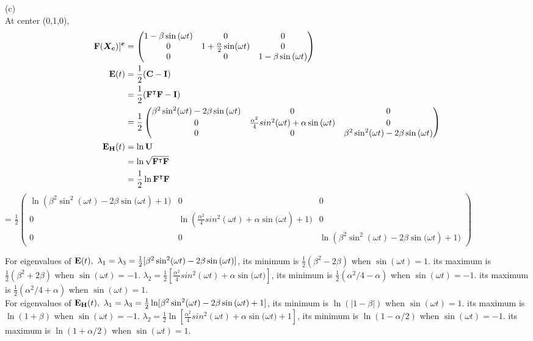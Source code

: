 \medskip
(c)
\\
At center (0,1,0),
\begin{align*}
\mathbf{F}(\bm{X_c})]^{\bm{e}}&=
\begin{pmatrix}
1-\beta \sin{(\omega t})&0&0\\
    0& 1+\frac{\alpha}{2}\sin({\omega t})&0\\
    0&0&1-\beta \sin{(\omega t})
\end{pmatrix} \\
    \mathbf{E}(t) &= 
    \frac12(\mathbf{C}-\mathbf{I}) \\
    &= \frac12(\mathbf{F^{\intercal}\mathbf{F}}-\mathbf{I})\\
    &= \frac12 \begin{pmatrix}
\beta^2\sin^2(\omega t)-2 \beta \sin{(\omega t})&0 & 0 \\
0 & \frac{\alpha^2}{4}sin^2(\omega t)+\alpha \sin{(\omega t}) & 0 \\
0 & 0 & \beta^2\sin^2(\omega t)-2 \beta \sin{(\omega t})
\end{pmatrix} \\
\mathbf{E_H}(t)&= \ln{\mathbf{U}} \\
&= \ln{\sqrt{\mathbf{F^{\intercal}\mathbf{F}}}}\\
& = \frac12\ln{\mathbf{F^{\intercal}\mathbf{F}}} \\
\end{align*}
= $\frac12 \begin{pmatrix}
\ln{(\beta^2\sin^2(\omega t)-2 \beta \sin{(\omega t})+1)}&0 & 0 \\
0 & \ln{(\frac{\alpha^2}{4}sin^2(\omega t)+\alpha \sin{(\omega t})+1)} & 0 \\
0 & 0 & \ln{(\beta^2\sin^2(\omega t)-2 \beta \sin{(\omega t})+1)}
\end{pmatrix}$ 

\medskip
For eigenvalues of $\bn{E}(t),\ \lambda_1=\lambda_3=\frac12[\beta^2\sin^2(\omega t)-2 \beta \sin{(\omega t})]$, its minimum is $\frac12(\beta^2-2\beta)$ when $\sin{(
\omega t)}=1$. its maximum is $\frac12(\beta^2+2\beta)$ when $\sin{(
\omega t)}=-1$.  $\lambda_2=\frac12[\frac{\alpha^2}{4}sin^2(\omega t)+\alpha \sin{(\omega t})]$, its minimum is $\frac12(\alpha^2/4-\alpha)$ when $\sin{(
\omega t)}=-1$. its maximum is $\frac12(\alpha^2/4+\alpha)$ when $\sin{(
\omega t)}=1$.\\
For eigenvalues of $\bn{E_{\bn{H}}}(t),\ \lambda_1=\lambda_3=\frac12\ln[\beta^2\sin^2(\omega t)-2 \beta \sin{(\omega t})+1]$, its minimum is $\ln(|1-\beta|)$ when $\sin{(
\omega t)}=1$. its maximum is $\ln(1+\beta)$ when $\sin{(
\omega t)}=-1$.  $\lambda_2=\frac12\ln[\frac{\alpha^2}{4}sin^2(\omega t)+\alpha \sin{(\omega t})+1]$, its minimum is $\ln(1-\alpha/2)$ when $\sin{(
\omega t)}=-1$. its maximum is $\ln(1+\alpha/2)$ when $\sin{(
\omega t)}=1$.


